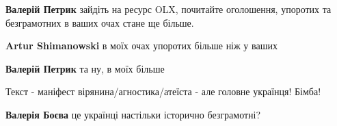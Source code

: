 \begin{itemize}
\begin{itemize}
 
\textbf{Валерій Петрик} зайдіть на ресурс OLX, почитайте оголошення, упоротих та безграмотних в ваших очах стане ще більше.

 
\textbf{Artur Shimanowski} в моїх очах упоротих більше ніж у ваших

 
\textbf{Валерій Петрик} та ну, в моїх більше \Smiley[1.0][yellow]

\end{itemize}

 
Текст - маніфест вірянина/агностика/атеїста - але головне українця! Бімба!

\begin{itemize}
 
\textbf{Валерія Боєва} це українці настільки історично безграмотні?
\end{itemize}

 

\end{itemize}
